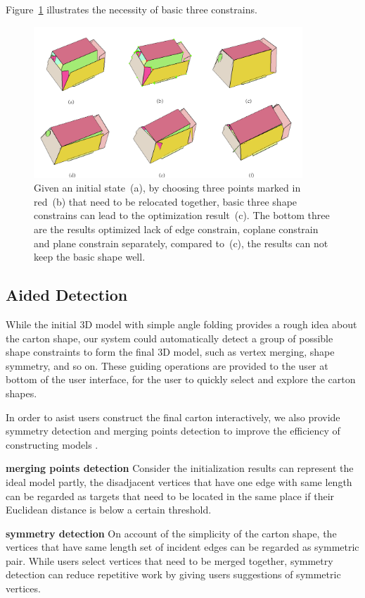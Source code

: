 Figure~\ref{fig:constrain} illustrates the necessity of basic three constrains.

\begin{figure}
	\centering
	\includegraphics[width=0.9\textwidth]{images/constrain.jpg}
	\caption{Given an initial state~(a), by choosing three points marked in red~(b) that need to be relocated together, basic three shape constrains can lead to the optimization result~(c). The bottom three are the results optimized lack of edge constrain, coplane constrain and plane constrain separately, compared to~(c), the results can not keep the basic shape well.}
	\label{fig:constrain}
\end{figure}


\subsection{Aided Detection}

While the initial 3D model with simple angle folding provides a rough idea about the carton shape, our system could automatically detect a group of possible shape constraints to form the final 3D model, such as vertex merging, shape symmetry, and so on. 
%
These guiding operations are provided to the user at bottom of the user interface, for the user to quickly select and explore the carton shapes.

%
In order to asist users construct the final carton interactively, we also provide symmetry detection and merging points detection to improve the efficiency of constructing models .

\noindent
\textbf{merging points detection} Consider the initialization results can represent the ideal model partly, the disadjacent vertices that have one edge with same length can be regarded as targets that need to be located in the same place if their Euclidean distance is below a certain threshold.

\noindent
\textbf{symmetry detection} On account of the simplicity of the carton shape, the vertices that have same length set of incident edges can be regarded as symmetric pair. While users select vertices that need to be merged together, symmetry detection can reduce repetitive work by giving users suggestions of symmetric vertices.